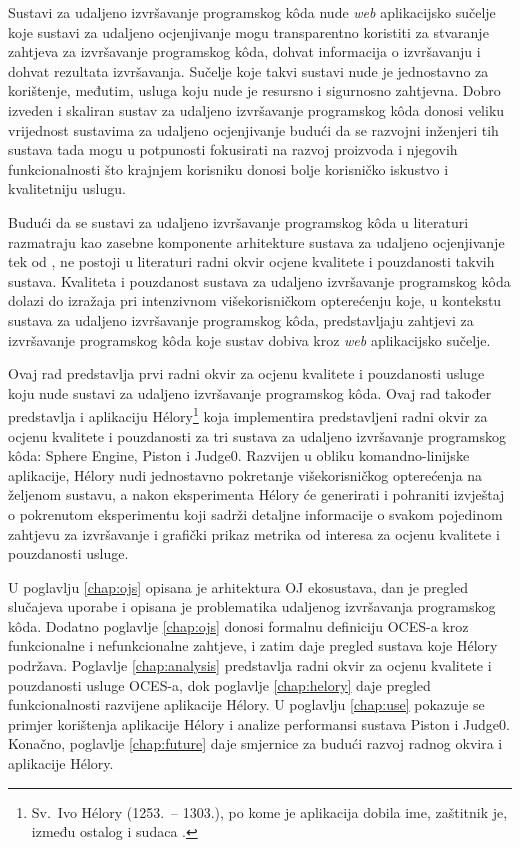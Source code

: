 \documentclass[times, utf8, diplomski]{fer}
\begin{document}
Sustavi za udaljeno izvršavanje programskog kôda nude \textit{web} aplikacijsko sučelje koje sustavi za udaljeno ocjenjivanje mogu transparentno koristiti za stvaranje zahtjeva za izvršavanje programskog kôda, dohvat informacija o izvršavanju i dohvat rezultata izvršavanja. Sučelje koje takvi sustavi nude je jednostavno za korištenje, međutim, usluga koju nude je resursno i sigurnosno zahtjevna. Dobro izveden i skaliran sustav za udaljeno izvršavanje programskog kôda donosi veliku vrijednost sustavima za udaljeno ocjenjivanje budući da se razvojni inženjeri tih sustava tada mogu u potpunosti fokusirati na razvoj proizvoda i njegovih funkcionalnosti što krajnjem korisniku donosi bolje korisničko iskustvo i kvalitetniju uslugu.

Budući da se sustavi za udaljeno izvršavanje programskog kôda u literaturi razmatraju kao zasebne komponente arhitekture sustava za udaljeno ocjenjivanje tek od \citep{9245310}, ne postoji u literaturi radni okvir ocjene kvalitete i pouzdanosti takvih sustava. Kvaliteta i pouzdanost sustava za udaljeno izvršavanje programskog kôda dolazi do izražaja pri intenzivnom višekorisničkom opterećenju koje, u kontekstu sustava za udaljeno izvršavanje programskog kôda, predstavljaju zahtjevi za izvršavanje programskog kôda koje sustav dobiva kroz \textit{web} aplikacijsko sučelje.

Ovaj rad predstavlja prvi radni okvir za ocjenu kvalitete i pouzdanosti usluge koju nude sustavi za udaljeno izvršavanje programskog kôda. Ovaj rad također predstavlja i aplikaciju Hélory\footnote{Sv.\ Ivo Hélory (1253.\ -- 1303.), po kome je aplikacija dobila ime, zaštitnik je, između ostalog i sudaca .} koja implementira predstavljeni radni okvir za ocjenu kvalitete i pouzdanosti za tri sustava za udaljeno izvršavanje programskog kôda: Sphere Engine, Piston i Judge0. Razvijen u obliku komandno-linijske aplikacije, Hélory nudi jednostavno pokretanje višekorisničkog opterećenja na željenom sustavu, a nakon eksperimenta Hélory će generirati i pohraniti izvještaj o pokrenutom eksperimentu koji sadrži detaljne informacije o svakom pojedinom zahtjevu za izvršavanje i grafički prikaz metrika od interesa za ocjenu kvalitete i pouzdanosti usluge.

U poglavlju \ref{chap:ojs} opisana je arhitektura OJ ekosustava, dan je pregled slučajeva uporabe i opisana je problematika udaljenog izvršavanja programskog kôda. Dodatno poglavlje \ref{chap:ojs} donosi formalnu definiciju OCES-a kroz funkcionalne i nefunkcionalne zahtjeve, i zatim daje pregled sustava koje Hélory podržava. Poglavlje \ref{chap:analysis} predstavlja radni okvir za ocjenu kvalitete i pouzdanosti usluge OCES-a, dok poglavlje \ref{chap:helory} daje pregled funkcionalnosti razvijene aplikacije Hélory. U poglavlju \ref{chap:use} pokazuje se primjer korištenja aplikacije Hélory i analize performansi sustava Piston i Judge0. Konačno, poglavlje \ref{chap:future} daje smjernice za budući razvoj radnog okvira i aplikacije Hélory.
\end{document}
